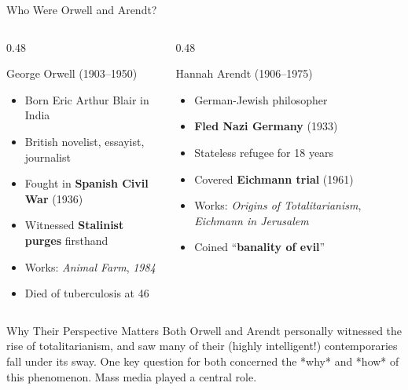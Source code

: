 \documentclass[aspectratio=169]{beamer}
\begin{document}
\begin{frame}{Who Were Orwell and Arendt?}
\begin{columns}
\begin{column}{0.48\textwidth}
\begin{block}{George Orwell (1903--1950)}
\begin{itemize}
  \item Born Eric Arthur Blair in India
  \item British novelist, essayist, journalist
  \item Fought in \textbf{Spanish Civil War} (1936)
  \item Witnessed \textbf{Stalinist purges} firsthand
  \item Works: \textit{Animal Farm}, \textit{1984}
  \item Died of tuberculosis at 46
\end{itemize}
\end{block}
\end{column}

\begin{column}{0.48\textwidth}
\begin{exampleblock}{Hannah Arendt (1906--1975)}
\begin{itemize}
  \item German-Jewish philosopher
  \item \textbf{Fled Nazi Germany} (1933)
  \item Stateless refugee for 18 years
  \item Covered \textbf{Eichmann trial} (1961)
  \item Works: \textit{Origins of Totalitarianism}, \textit{Eichmann in Jerusalem}
  \item Coined ``\textbf{banality of evil}''
\end{itemize}
\end{exampleblock}
\end{column}
\end{columns}

\vspace{0.3em}
\begin{alertblock}{Why Their Perspective Matters}
Both Orwell and Arendt personally witnessed the rise of totalitarianism, and saw many of their (highly intelligent!) contemporaries fall under its sway. One key question for both concerned the *why* and *how* of this phenomenon. Mass media played a central role.
\end{alertblock}
\end{frame}
\end{document}
